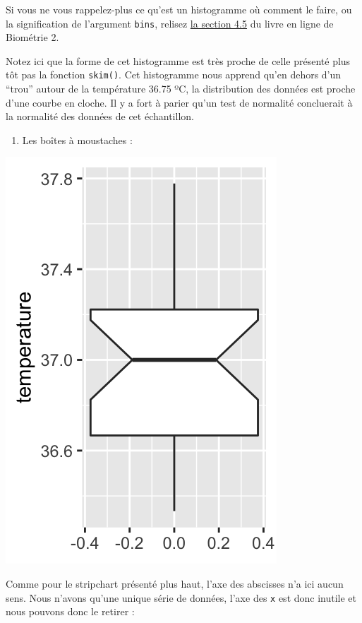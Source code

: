 \documentclass[a4paperpaper,]{article}
\newenvironment{Shaded}{\begin{snugshade}}{\end{snugshade}}
\newcommand{\DataTypeTok}[1]{\textcolor[rgb]{0.00,0.34,0.68}{#1}}
\newcommand{\KeywordTok}[1]{\textcolor[rgb]{0.12,0.11,0.11}{\textbf{#1}}}
\newcommand{\NormalTok}[1]{\textcolor[rgb]{0.12,0.11,0.11}{#1}}
\newcommand{\OperatorTok}[1]{\textcolor[rgb]{0.12,0.11,0.11}{#1}}
\newcommand{\OtherTok}[1]{\textcolor[rgb]{0.00,0.43,0.16}{#1}}
\newcommand{\StringTok}[1]{\textcolor[rgb]{0.75,0.01,0.01}{#1}}
\providecommand{\tightlist}{%
  \setlength{\itemsep}{0pt}\setlength{\parskip}{0pt}}
\begin{document}
Si vous ne vous rappelez-plus ce qu'est un histogramme où comment le faire, ou la signification de l'argument \texttt{bins}, relisez \href{https://besibo.github.io/DA/viz.html\#histogram}{la section 4.5} du livre en ligne de Biométrie 2.

Notez ici que la forme de cet histogramme est très proche de celle présenté plus tôt pas la fonction \texttt{skim()}. Cet histogramme nous apprend qu'en dehors d'un ``trou'' autour de la température 36.75 ºC, la distribution des données est proche d'une courbe en cloche. Il y a fort à parier qu'un test de normalité concluerait à la normalité des données de cet échantillon.

\begin{enumerate}
\def\labelenumi{\arabic{enumi}.}
\setcounter{enumi}{2}
\tightlist
\item
  Les boîtes à moustaches :
\end{enumerate}

\begin{Shaded}
\end{Shaded}

\begin{center}\includegraphics[width=0.25\linewidth]{figure/unnamed-chunk-19-1} \end{center}

Comme pour le stripchart présenté plus haut, l'axe des abscisses n'a ici aucun sens. Nous n'avons qu'une unique série de données, l'axe des \texttt{x} est donc inutile et nous pouvons donc le retirer :

\begin{Shaded}
\end{Shaded}
\end{document}
